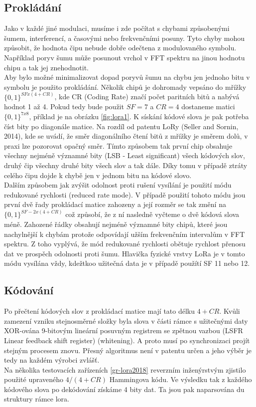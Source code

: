 \documentclass{ctuthesis}
\begin{document}
\subsection{Prokládání}
Jako v každé jiné modulaci, musíme i zde počítat s chybami způsobenými šumem, interferencí, a časovými nebo frekvenčními posuny. Tyto chyby mohou způsobit, že hodnota čipu nebude dobře odečtena z modulovaného symbolu. Například poryv šumu může posunout vrchol v FFT spektru na jinou hodnotu chipu a tak jej znehodnotit.\\
Aby bylo možné minimalizovat dopad poryvů šumu na chybu jen jednoho bitu v symbolu je použito prokládání. Několik chipů je dohromady vepsáno do mřížky $\{0,1\}^{SF x (4 + CR)}$, kde CR (Coding Rate) značí počet paritních bitů a nabývá hodnot 1 až 4. Pokud tedy bude použit $SF = 7$ a $CR =4$ dostaneme matici  $\{0,1\}^{7 x 8}$, příklad je na obrázku \ref{fig:lora1}. K sískání kódové slova je pak potřeba číst bity po diagonále matice. Na rozdíl od patentu LoRy (Seller and Sornin, 2014), kde se uvádí, že směr diagonálního čtení bitů z mřížky je směrem dolů, v praxi lze pozorovat opačný směr. Tímto způsobem tak první chip obsahuje všechny nejméně významné bity (LSB - Least significant) všech kódových slov, druhý čip všechny druhé bity všech slov a tak dále. Díky tomu v případě ztráty celého čipu dojde k chybě jen v jednom bitu na kódové slovo.\\
Dalším způsobem jak zvýšit odolnost proti rušení vysílání je použití módu redukované rychlosti (reduced rate mode). V případě použití tohoto módu jsou první dvě řady prokládací matice zahozeny a její rozměr se tak změní na $\{0,1\}^{SF-2 x (4 + CR)}$ což způsobí, že z ní nasledně vyčteme o dvě kódová slova méně. Zahozené řádky obsahují nejméně významné bity chipů, které jsou nachylnější k chybám protože odpovídají užším frekvenčním intervalům v FFT spektru. Z toho vyplývá, že mód redukované rychlosti obětuje rychlost přenosu dat ve prospěch odolnosti proti šumu. Hlavička fyzické vrstvy LoRa je v tomto módu vysílána vždy, kdežtkoo užitečná data je v případě použítí SF 11 nebo 12.

\subsection{Kódování}
Po přečtení kódových slov z prokládací matice mají tato délku $4 + CR$. Kvůli zamezení vzniku stejnosměrné složky byla slova v části rámce s užitečnými daty XOR-ována 9-bitovým lineární posuvným registrem se zpětnou vazbou (LSFR Linear feedback shift register) (whitening). A proto musí po synchronizaci projít stejným procesem znovu. Přesný algoritmus není v patentu určen a jeho výběr je tedy na každém výrobci zvlášť. \\
Na několika testovacích zařízeních \ref{gr-lora2018} reverzním inženýrstvým zjistilo použité upraveného $4/(4 + CR)$ Hammingova kódu. Ve výsledku tak z každého kódového slova po dekódování získáme 4 bity dat. Ta jsou pak naparsována du struktury rámce lora.
\end{document}
